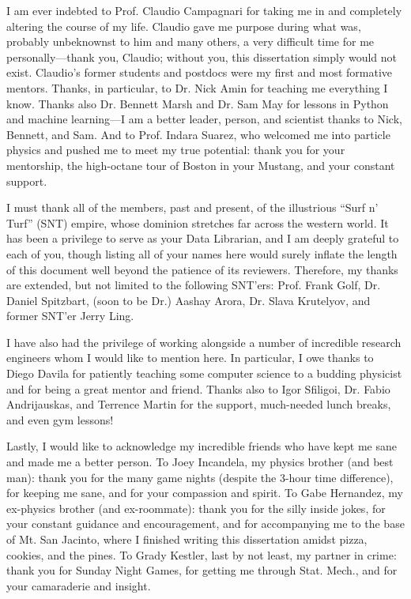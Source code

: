 \begin{acknowledgements}
I am ever indebted to Prof. Claudio Campagnari for taking me in and completely altering the course of my life. 
Claudio gave me purpose during what was, probably unbeknownst to him and many others, a very difficult time for me personally---thank you, Claudio; without you, this dissertation simply would not exist. 
Claudio's former students and postdocs were my first and most formative mentors. 
Thanks, in particular, to Dr. Nick Amin for teaching me everything I know. 
Thanks also Dr. Bennett Marsh and Dr. Sam May for lessons in Python and machine learning---I am a better leader, person, and scientist thanks to Nick, Bennett, and Sam. 
And to Prof. Indara Suarez, who welcomed me into particle physics and pushed me to meet my true potential: thank you for your mentorship, the high-octane tour of Boston in your Mustang, and your constant support. 

I must thank all of the members, past and present, of the illustrious ``Surf n' Turf'' (SNT) empire, whose dominion stretches far across the western world. 
It has been a privilege to serve as your Data Librarian, and I am deeply grateful to each of you, though listing all of your names here would surely inflate the length of this document well beyond the patience of its reviewers. 
Therefore, my thanks are extended, but not limited to the following SNT'ers: Prof. Frank Golf, Dr. Daniel Spitzbart, (soon to be Dr.) Aashay Arora, Dr. Slava Krutelyov, and former SNT'er Jerry Ling.

I have also had the privilege of working alongside a number of incredible research engineers whom I would like to mention here. 
In particular, I owe thanks to Diego Davila for patiently teaching some computer science to a budding physicist and for being a great mentor and friend. 
Thanks also to Igor Sfiligoi, Dr. Fabio Andrijauskas, and Terrence Martin for the support, much-needed lunch breaks, and even gym lessons! 

Lastly, I would like to acknowledge my incredible friends who have kept me sane and made me a better person. 
To Joey Incandela, my physics brother (and best man): thank you for the many game nights (despite the 3-hour time difference), for keeping me sane, and for your compassion and spirit. 
To Gabe Hernandez, my ex-physics brother (and ex-roommate): thank you for the silly inside jokes, for your constant guidance and encouragement, and for accompanying me to the base of Mt. San Jacinto, where I finished writing this dissertation amidst pizza, cookies, and the pines. 
To Grady Kestler, last by not least, my partner in crime: thank you for Sunday Night Games, for getting me through Stat. Mech., and for your camaraderie and insight. 


\end{acknowledgements}
